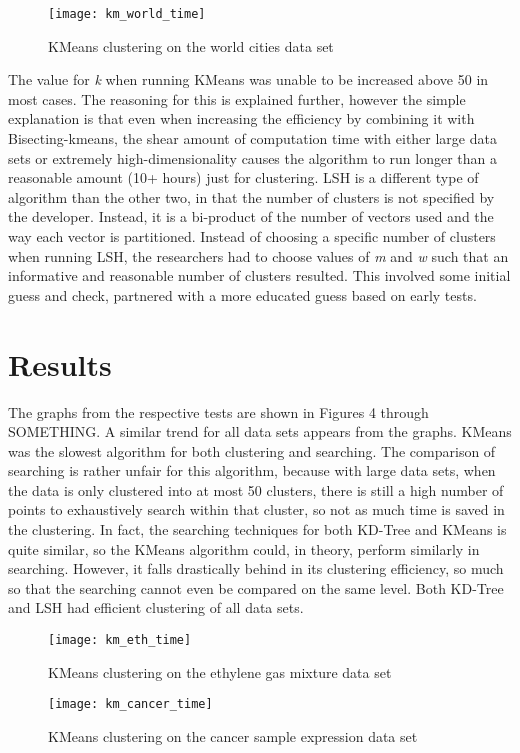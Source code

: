 \documentclass[journal]{IEEEtran}
\begin{document}
\begin{figure}[b]
	\texttt{[image: km\_world\_time]}
	\caption{KMeans clustering on the world cities data set}
\end{figure}

The value for \textit{k} when running KMeans was unable to be increased above 50 in most cases. The reasoning for this is explained further, however the simple explanation is that even when increasing the efficiency by combining it with Bisecting-kmeans, the shear amount of computation time with either large data sets or extremely high-dimensionality causes the algorithm to run longer than a reasonable amount (10+ hours) just for clustering. LSH is a different type of algorithm than the other two, in that the number of clusters is not specified by the developer. Instead, it is a bi-product of the number of vectors used and the way each vector is partitioned. Instead of choosing a specific number of clusters when running LSH, the researchers had to choose values of \textit{m} and \textit{w} such that an informative and reasonable number of clusters resulted. This involved some initial guess and check, partnered with a more educated guess based on early tests.

\section{Results}
The graphs from the respective tests are shown in Figures 4 through SOMETHING. A similar trend for all data sets appears from the graphs. KMeans was the slowest algorithm for both clustering and searching. The comparison of searching is rather unfair for this algorithm, because with large data sets, when the data is only clustered into at most 50 clusters, there is still a high number of points to exhaustively search within that cluster, so not as much time is saved in the clustering. In fact, the searching techniques for both KD-Tree and KMeans is quite similar, so the KMeans algorithm could, in theory, perform similarly in searching. However, it falls drastically behind in its clustering efficiency, so much so that the searching cannot even be compared on the same level. Both KD-Tree and LSH had efficient clustering of all data sets. 

\begin{figure}[h]
	\texttt{[image: km\_eth\_time]}
	\caption{KMeans clustering on the ethylene gas mixture data set}
\end{figure}
\begin{figure}[h]
	\texttt{[image: km\_cancer\_time]}
	\caption{KMeans clustering on the cancer sample expression data set}
\end{figure}
\end{document}
